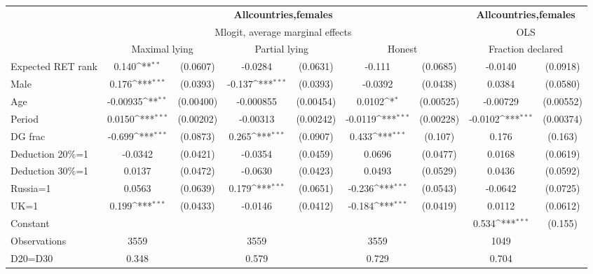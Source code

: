 \def\sym#1{\ifmmode^{#1}\else\(^{#1}\)\fi}
\begin{tabular}{l|cccccc|cc}
\hline\hline
&\multicolumn{6}{c|}{\bf All\space{}countries,\space{}females}&\multicolumn{2}{c}{\bf All\space{}countries,\space{}females}\\ &\multicolumn{6}{c|}{Mlogit, average marginal effects }&\multicolumn{2}{c}{OLS}\\
                &\multicolumn{2}{c}{Maximal lying}&\multicolumn{2}{c}{Partial lying}&\multicolumn{2}{c}{Honest}  &\multicolumn{2}{c}{Fraction declared}\\
\hline
Expected RET rank&    0.140\sym{**} & (0.0607)&  -0.0284         & (0.0631)&   -0.111         & (0.0685)&  -0.0140         & (0.0918)\\
Male            &    0.176\sym{***}& (0.0393)&   -0.137\sym{***}& (0.0393)&  -0.0392         & (0.0438)&   0.0384         & (0.0580)\\
Age             & -0.00935\sym{**} &(0.00400)&-0.000855         &(0.00454)&   0.0102\sym{*}  &(0.00525)& -0.00729         &(0.00552)\\
Period          &   0.0150\sym{***}&(0.00202)& -0.00313         &(0.00242)&  -0.0119\sym{***}&(0.00228)&  -0.0102\sym{***}&(0.00374)\\
DG frac         &   -0.699\sym{***}& (0.0873)&    0.265\sym{***}& (0.0907)&    0.433\sym{***}&  (0.107)&    0.176         &  (0.163)\\
Deduction 20\%=1&  -0.0342         & (0.0421)&  -0.0354         & (0.0459)&   0.0696         & (0.0477)&   0.0168         & (0.0619)\\
Deduction 30\%=1&   0.0137         & (0.0472)&  -0.0630         & (0.0423)&   0.0493         & (0.0529)&   0.0436         & (0.0592)\\
Russia=1        &   0.0563         & (0.0639)&    0.179\sym{***}& (0.0651)&   -0.236\sym{***}& (0.0543)&  -0.0642         & (0.0725)\\
UK=1            &    0.199\sym{***}& (0.0433)&  -0.0146         & (0.0412)&   -0.184\sym{***}& (0.0419)&   0.0112         & (0.0612)\\
Constant        &                  &         &                  &         &                  &         &    0.534\sym{***}&  (0.155)\\
\hline
Observations    &     3559         &         &     3559         &         &     3559         &         &     1049         &         \\
D20=D30         &    0.348         &         &    0.579         &         &    0.729         &         &    0.704         &         \\

\end{tabular}
